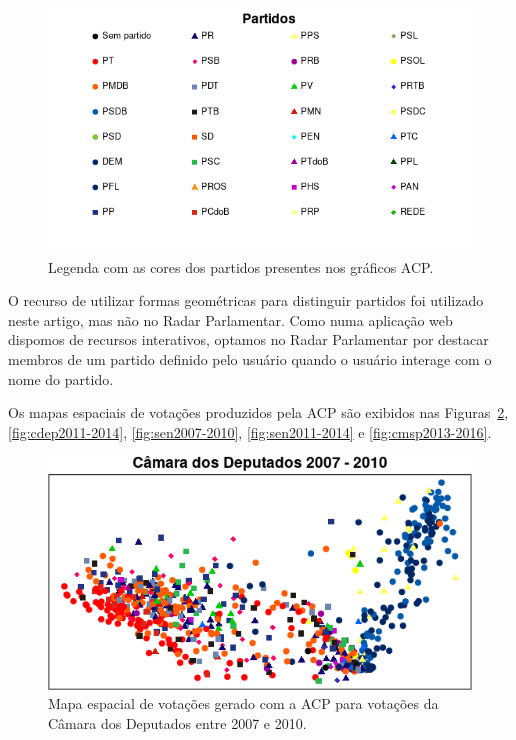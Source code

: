 \documentclass[a4paper, 12pt]{article}
\begin{document}
\begin{figure}[h!]
  \centering
  \includegraphics[scale=0.8]{figs/partidos.png}
  \caption{Legenda com as cores dos partidos presentes nos gráficos ACP.}
  \label{fig:partidos}
\end{figure}

O recurso de utilizar formas geométricas para distinguir partidos foi utilizado neste artigo, mas não no Radar Parlamentar. Como numa aplicação web dispomos de recursos interativos, optamos no Radar Parlamentar por destacar membros de um partido definido pelo usuário quando o usuário interage com o nome do partido.

Os mapas espaciais de votações produzidos pela ACP são exibidos nas Figuras~\ref{fig:cdep2007-2010}, \ref{fig:cdep2011-2014}, \ref{fig:sen2007-2010}, \ref{fig:sen2011-2014} e \ref{fig:cmsp2013-2016}.

\begin{figure}[h!]
  \centering
  \includegraphics[scale=0.9]{figs/cdep2007-2010.png}
  \caption{Mapa espacial de votações gerado com a ACP para votações da Câmara dos Deputados entre 2007 e 2010.}
  \label{fig:cdep2007-2010}
\end{figure}
\end{document}
